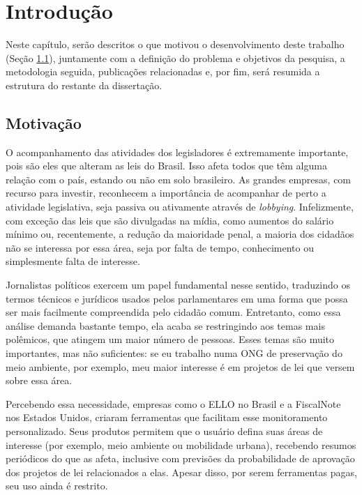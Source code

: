 \chapter{Introdução} \label{intro}

Neste capítulo, serão descritos o que motivou o desenvolvimento deste trabalho
(Seção \ref{sec:motivacao}), juntamente com a definição do problema e objetivos
da pesquisa, a metodologia seguida, publicações relacionadas e, por fim, será
resumida a estrutura do restante da dissertação.

\section{Motivação}\label{sec:motivacao}

O acompanhamento das atividades dos legisladores é extremamente importante,
pois são eles que alteram as leis do Brasil. Isso afeta todos que têm alguma
relação com o país, estando ou não em solo brasileiro. As grandes empresas,
com recurso para investir, reconhecem a importância de acompanhar de perto a
atividade legislativa, seja passiva ou ativamente através de \emph{lobbying}.
Infelizmente, com exceção das leis que são divulgadas na mídia, como aumentos
do salário mínimo ou, recentemente, a redução da maioridade penal, a maioria
dos cidadãos não se interessa por essa área, seja por falta de tempo,
conhecimento ou simplesmente falta de interesse.

Jornalistas políticos exercem um papel fundamental nesse sentido, traduzindo os
termos técnicos e jurídicos usados pelos parlamentares em uma forma que possa
ser mais facilmente compreendida pelo cidadão comum. Entretanto, como essa
análise demanda bastante tempo, ela acaba se restringindo aos temas mais
polêmicos, que atingem um maior número de pessoas. Esses temas são muito
importantes, mas não suficientes: se eu trabalho numa ONG de preservação do
meio ambiente, por exemplo, meu maior interesse é em projetos de lei que versem
sobre essa área.

Percebendo essa necessidade, empresas como o \gls{ELLO} no Brasil e a
FiscalNote nos Estados Unidos, criaram ferramentas que facilitam esse
monitoramento personalizado. Seus produtos permitem que o usuário defina suas
áreas de interesse (por exemplo, meio ambiente ou mobilidade urbana),
recebendo resumos periódicos do que as afeta, inclusive com previsões da
probabilidade de aprovação dos projetos de lei relacionados a elas. Apesar
disso, por serem ferramentas pagas, seu uso ainda é restrito.

